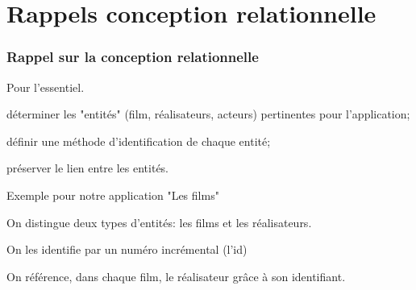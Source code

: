 


\section{Rappels conception relationnelle}

\begin{frame}
\frametitle{Rappel sur la conception relationnelle}

Pour l'essentiel.

\begin{redbullet}
  \item déterminer les "entités" (film, réalisateurs, acteurs) pertinentes pour l'application; 
  \item définir une méthode d'identification de chaque entité;  
  \item préserver le lien entre les entités.
\end{redbullet}

\vfill

Exemple pour notre application "Les films"

\begin{redbullet}
  \item  On distingue  deux types d'entités: les films et les réalisateurs.
  \item On les identifie par un numéro incrémental (l'id)
  \item On référence, dans chaque film, le réalisateur grâce à son identifiant.
\end{redbullet}


\end{frame}



